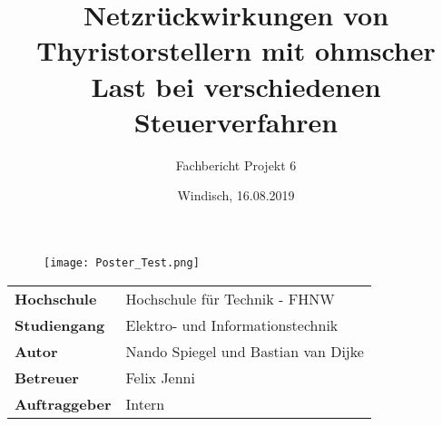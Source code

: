 \documentclass[final]{fhnwreport}       %
\title{Netzrückwirkungen von Thyristorstellern mit ohmscher Last bei verschiedenen Steuerverfahren}          %
\author{Fachbericht Projekt 6}          %
\date{Windisch, 16.08.2019}             %
\begin{document}
\maketitle

\vspace*{-1cm}						    %
\vfill
\begin{figure}[H]
\centering
\texttt{[image: Poster\_Test.png]}
\end{figure}
\vfill

{
\renewcommand\arraystretch{2}
\begin{center}
\begin{tabular}{>{\bf}p{4cm} l}
Hochschule                 &    Hochschule für Technik - FHNW\\
Studiengang                &    Elektro- und Informationstechnik\\
Autor   		           & 	Nando Spiegel und Bastian van Dijke\\
Betreuer                   &    Felix Jenni\\
Auftraggeber               &    Intern\\
\end{tabular}
\end{center}
}

\clearpage
			
\thispagestyle{empty}

%

\tableofcontents
\clearpage










{\sloppypar
\printbibliography[heading=bibintoc]
\label{sec:lit}
}
\listoffigures
\listoftables


\ifdraft{%
\newpage
\clearpage
}
{%
}
\end{document}
